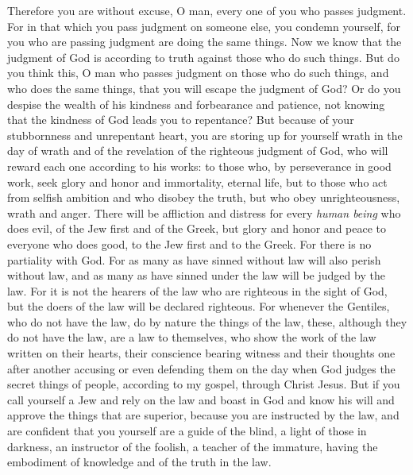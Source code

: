 \begin{biblechapter} %
 Therefore you are without excuse, O man, every one of you who passes judgment. For in that which you pass judgment on someone else, you condemn yourself, for you who are passing judgment are doing the same things.
\verse Now we know that the judgment of God is according to truth against those who do such things.
\verse But do you think this, O man who passes judgment on those who do such things, and who does the same things, that you will escape the judgment of God?
\verse Or do you despise the wealth of his kindness and forbearance and patience, not knowing that the kindness of God leads you to repentance?
\verse But because of your stubbornness and unrepentant heart, you are storing up for yourself wrath in the day of wrath and of the revelation of the righteous judgment of God,
\verse who will reward each one according to his works:
\verse to those who, by perseverance in good work, seek glory and honor and immortality, eternal life,
\verse but to those who act from selfish ambition and who disobey the truth, but who obey unrighteousness, wrath and anger.
\verse There will be affliction and distress for every \textit{human being} who does evil, of the Jew first and of the Greek,
\verse but glory and honor and peace to everyone who does good, to the Jew first and to the Greek.
\verse For there is no partiality with God.
\verse For as many as have sinned without law will also perish without law, and as many as have sinned under the law will be judged by the law.
\verse For it is not the hearers of the law who are righteous in the sight of God, but the doers of the law will be declared righteous.
\verse For whenever the Gentiles, who do not have the law, do by nature the things of the law, these, although they do not have the law, are a law to themselves,
\verse who show the work of the law written on their hearts, their conscience bearing witness and their thoughts one after another accusing or even defending them
\verse on the day when God judges the secret things of people, according to my gospel, through Christ Jesus.
 But if you call yourself a Jew and rely on the law and boast in God
\verse and know his will and approve the things that are superior, because you are instructed by the law,
\verse and are confident that you yourself are a guide of the blind, a light of those in darkness,
\verse an instructor of the foolish, a teacher of the immature, having the embodiment of knowledge and of the truth in the law.

\end{biblechapter}
